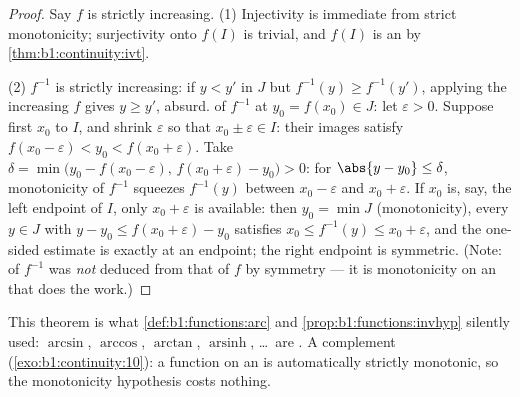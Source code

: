 \begin{proof}
Say $f$ is strictly increasing. (1) Injectivity is immediate from
strict monotonicity; surjectivity onto $f(I)$ is trivial, and $f(I)$
is an  by \cref{thm:b1:continuity:ivt}.

(2) $f^{-1}$ is strictly increasing: if $y < y'$ in $J$ but $f^{-1}(y)
\geq f^{-1}(y')$, applying the increasing $f$ gives $y \geq y'$,
absurd.  of $f^{-1}$ at $y_0 = f(x_0) \in J$: let
$\varepsilon > 0$. Suppose first $x_0$  to $I$, and
shrink $\varepsilon$ so that $x_0 \pm \varepsilon \in I$: their
images satisfy $f(x_0 - \varepsilon) < y_0 < f(x_0 +
\varepsilon)$. Take
$\delta = \min\bigl(y_0 - f(x_0 - \varepsilon),\, f(x_0 +
\varepsilon) - y_0\bigr) > 0$: for $\abs{y - y_0} \leq \delta$,
monotonicity of $f^{-1}$ squeezes $f^{-1}(y)$ between $x_0 -
\varepsilon$ and $x_0 + \varepsilon$. If $x_0$ is, say, the left
endpoint of $I$, only $x_0 + \varepsilon$ is available: then
$y_0 = \min J$ (monotonicity), every $y \in J$ with $y - y_0
\leq f(x_0 + \varepsilon) - y_0$ satisfies $x_0 \leq f^{-1}(y)
\leq x_0 + \varepsilon$, and the one-sided estimate is exactly
 at an endpoint; the right endpoint is symmetric.
(Note:  of $f^{-1}$
was \emph{not} deduced from that of $f$ by symmetry --- it is
monotonicity on an  that does the work.)
\end{proof}

\begin{remark}
This theorem is what \cref{def:b1:functions:arc} and
\cref{prop:b1:functions:invhyp} silently used: $\arcsin$, $\arccos$,
$\arctan$, $\operatorname{arsinh}$, \dots\ are . A
complement (\cref{exo:b1:continuity:10}): a 
\emph{} function on an  is automatically strictly
monotonic, so the monotonicity hypothesis costs nothing.
\end{remark}

